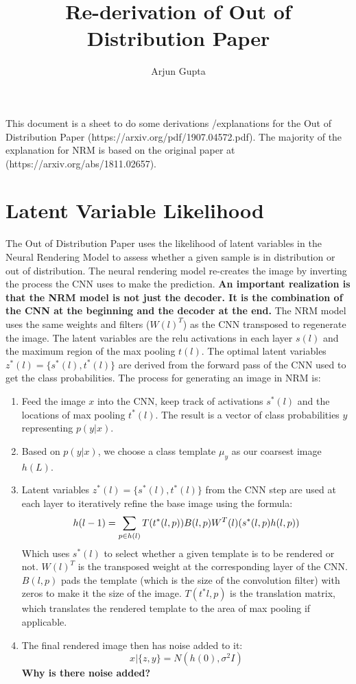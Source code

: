 \documentclass{report}
\title{Re-derivation of Out of Distribution Paper}
\author{Arjun Gupta}
\begin{document}
	\maketitle 
	
	This document is a sheet to do some derivations /explanations for the Out of Distribution Paper (https://arxiv.org/pdf/1907.04572.pdf). The majority of the explanation for NRM is based on the original paper at (https://arxiv.org/abs/1811.02657).
	
	\section{Latent Variable Likelihood}
	The Out of Distribution Paper uses the likelihood of latent variables in the Neural Rendering Model to assess whether a given sample is in distribution or out of distribution. The neural rendering model re-creates the image by inverting the process the CNN uses to make the prediction. \textbf{An important realization is that the NRM model is not just the decoder. It is the combination of the CNN at the beginning and the decoder at the end.} The NRM model uses the same weights and filters ($W(l)^T$) as the CNN transposed to regenerate the image. The latent variables are the relu activations in each layer $s(l)$ and the maximum region of the max pooling $t(l)$. The optimal latent variables $z^*(l) = \{s^*(l), t^*(l)\}$ are derived from the forward pass of the CNN used to get the class probabilities. The process for generating an image in NRM is:
	\begin{enumerate}
		\item Feed the image $x$ into the CNN, keep track of activations $s^*(l)$ and the locations of max pooling $t^*(l)$. The result is a vector of class probabilities $y$ representing $p(y|x)$.
		\item Based on $p(y|x)$, we choose a class template $\mu_y$ as our coarsest image $h(L)$.
		\item Latent variables $z^*(l) = \{s^*(l), t^*(l)\}$ from the CNN step are used at each layer to iteratively refine the base image using the formula:
		\begin{equation}
			h(l-1) = \sum_{p \in h(l)} T(t^*(l, p))B(l,p)W^T(l)(s^*(l, p) h(l, p))\\
		\end{equation}
		Which uses $s^*(l)$ to select whether a given template is to be rendered or not. $W(l)^T$ is the transposed weight at the corresponding layer of the CNN. $B(l,p)$ pads the template (which is the size of the convolution filter) with zeros to make it the size of the image. $T(t^*l,p)$ is the translation matrix, which translates the rendered template to the area of max pooling if applicable.
		\item The final rendered image then has noise added to it:
		\begin{equation}
			x | \{z, y\} = N(h(0), \sigma^2I)
		\end{equation}
		\textbf{Why is there noise added?}
	\end{enumerate}	
	
\end{document}
